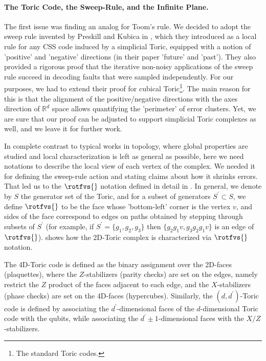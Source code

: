 \paragraph{The Toric Code, the Sweep-Rule, and the Infinite Plane.}
The first issue was finding an analog for Toom's rule. We decided to adopt the sweep rule invented by Preskill and Kubica in \cite{Kubica_2019}, which they introduced as a local rule for any CSS code induced by a simplicial Toric, equipped with a notion of 'positive' and 'negative' directions (in their paper 'future' and 'past'). They also provided a rigorous proof that the iterative non-noisy applications of the sweep rule succeed in decoding faults that were sampled independently. For our purposes, we had to extend their proof for cubical Toric\footnote{The standard Toric codes.}. The main reason for this is that the alignment of the positive/negative directions with the axes direction of $\mathbb{R}^{d}$ space allows quantifying the 'perimeter' of error clusters. Yet, we are sure that our proof can be adjusted to support simplicial Toric complexes as well, and we leave it for further work.



In complete contrast to typical works in topology, where global properties are studied and local characterization is left as general as possible, here we need notations to describe the local view of each vertex of the complex. We needed it for defining the sweep-rule action and stating claims about how it shrinks errors. That led us to the $\rotfvs{}$ notation defined in detail in . In general, we denote by $S$ the generator set of the Toric, and for a subset of generators $S^{\prime} \subset S$, we define $\rotfvs{ }$ to be the face whose 'bottom-left' corner is the vertex $v$, and sides of the face correspond to edges on paths obtained by stepping through subsets of $S^{\prime}$ (for example, if $S^{\prime} = \{g_{1},g_{2},g_{3} \}$ then $\{g_{2}g_{1}v, g_{3}g_{2}g_{1}v\}$ is an edge of $\rotfvs{}$).   shows how the 2D-Toric complex is characterized via $\rotfvs{}$ notation.  


The 4D-Toric code is defined as the binary assignment over the 2D-faces (plaquettes), where the $Z$-stabilizers (parity checks) are set on the edges, namely restrict the $Z$ product of the faces adjacent to each edge, and the $X$-stabilizers (phase checks) are set on the 4D-faces (hypercubes). Similarly, the $(d,d^{\prime})$-Toric code is defined by associating the $d^{\prime}$-dimensional faces of the $d$-dimensional Toric code with the qubits, while associating the $d^{\prime}\pm 1$-dimensional faces with the $X/Z$-stabilizers.


